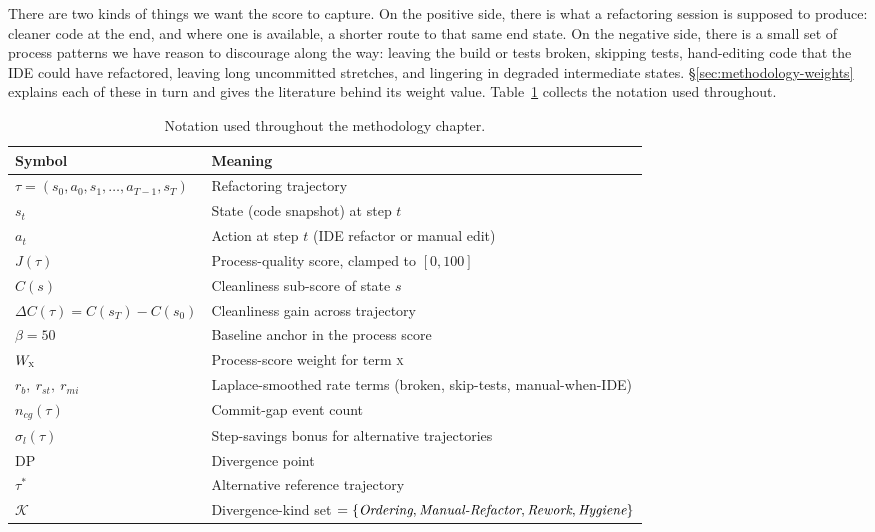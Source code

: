 There are two kinds of things we want the score to capture. On the positive side, there is what a refactoring session is supposed to produce: cleaner code at the end, and where one is available, a shorter route to that same end state. On the negative side, there is a small set of process patterns we have reason to discourage along the way: leaving the build or tests broken, skipping tests, hand-editing code that the IDE could have refactored, leaving long uncommitted stretches, and lingering in degraded intermediate states. \S\ref{sec:methodology-weights} explains each of these in turn and gives the literature behind its weight value. Table~\ref{tab:methodology-notation} collects the notation used throughout.

\begin{table}[H]
\centering
\small
\begin{tabular}{ll}
\hline
\textbf{Symbol} & \textbf{Meaning} \\
\hline
$\tau = (s_0, a_0, s_1, \ldots, a_{T-1}, s_T)$ & Refactoring trajectory \\
$s_t$ & State (code snapshot) at step $t$ \\
$a_t$ & Action at step $t$ (IDE refactor or manual edit) \\
$J(\tau)$ & Process-quality score, clamped to $[0, 100]$ \\
$C(s)$ & Cleanliness sub-score of state $s$ \\
$\Delta C(\tau) = C(s_T) - C(s_0)$ & Cleanliness gain across trajectory \\
$\beta = 50$ & Baseline anchor in the process score \\
$W_{\textsc{x}}$ & Process-score weight for term \textsc{x} \\
$r_b,\ r_{st},\ r_{mi}$ & Laplace-smoothed rate terms (broken, skip-tests, manual-when-IDE) \\
$n_{cg}(\tau)$ & Commit-gap event count \\
$\sigma_l(\tau)$ & Step-savings bonus for alternative trajectories \\
$\mathrm{DP}$ & Divergence point \\
$\tau^{\ast}$ & Alternative reference trajectory \\
$\mathcal{K}$ & Divergence-kind set $= \{\emph{Ordering}, \emph{Manual-Refactor}, \emph{Rework}, \emph{Hygiene}\}$ \\
\hline
\end{tabular}
\caption{Notation used throughout the methodology chapter.}
\label{tab:methodology-notation}
\end{table}

